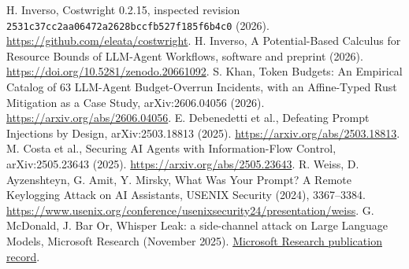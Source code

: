  H. Inverso, Costwright 0.2.15, inspected revision
\nolinkurl{2531c37cc2aa06472a2628bccfb527f185f6b4c0} (2026).
\url{https://github.com/eleata/costwright}.
 H. Inverso, A Potential-Based Calculus for Resource
Bounds of LLM-Agent Workflows, software and preprint (2026).
\url{https://doi.org/10.5281/zenodo.20661092}.
 S. Khan, Token Budgets: An Empirical Catalog of 63
LLM-Agent Budget-Overrun Incidents, with an Affine-Typed Rust Mitigation as a
Case Study, arXiv:2606.04056 (2026). \url{https://arxiv.org/abs/2606.04056}.
 E. Debenedetti et al., Defeating Prompt Injections by Design,
arXiv:2503.18813 (2025). \url{https://arxiv.org/abs/2503.18813}.
 M. Costa et al., Securing AI Agents with Information-Flow
Control, arXiv:2505.23643 (2025). \url{https://arxiv.org/abs/2505.23643}.
 R. Weiss, D. Ayzenshteyn, G. Amit, Y. Mirsky,
What Was Your Prompt? A Remote Keylogging Attack on AI Assistants,
USENIX Security (2024), 3367--3384.
\url{https://www.usenix.org/conference/usenixsecurity24/presentation/weiss}.
 G. McDonald, J. Bar Or, Whisper Leak: a side-channel attack
on Large Language Models, Microsoft Research (November 2025).
\href{https://www.microsoft.com/en-us/research/publication/whisper-leak-a-side-channel-attack-on-large-language-models/}{Microsoft Research publication record}.
